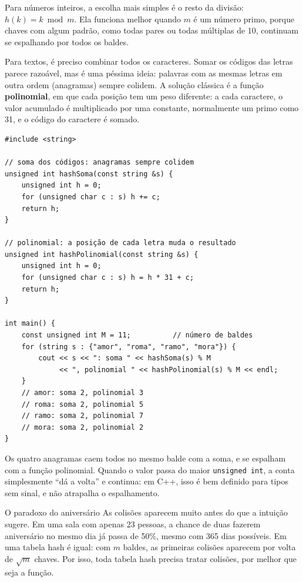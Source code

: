 Para números inteiros, a escolha mais simples é o resto da divisão: $h(k) = k \bmod m$. Ela funciona melhor quando $m$ é um número primo, porque chaves com algum padrão, como todas pares ou todas múltiplas de 10, continuam se espalhando por todos os baldes.

Para textos, é preciso combinar todos os caracteres. Somar os códigos das letras parece razoável, mas é uma péssima ideia: palavras com as mesmas letras em outra ordem (anagramas) sempre colidem. A solução clássica é a função \textbf{polinomial}, em que cada posição tem um peso diferente: a cada caractere, o valor acumulado é multiplicado por uma constante, normalmente um primo como 31, e o código do caractere é somado.

\begin{codigo}
\begin{Verbatim}[breaklines=true, breaksymbolleft={}, fontsize=\footnotesize]
#include <string>

// soma dos códigos: anagramas sempre colidem
unsigned int hashSoma(const string &s) {
    unsigned int h = 0;
    for (unsigned char c : s) h += c;
    return h;
}

// polinomial: a posição de cada letra muda o resultado
unsigned int hashPolinomial(const string &s) {
    unsigned int h = 0;
    for (unsigned char c : s) h = h * 31 + c;
    return h;
}

int main() {
    const unsigned int M = 11;          // número de baldes
    for (string s : {"amor", "roma", "ramo", "mora"}) {
        cout << s << ": soma " << hashSoma(s) % M
             << ", polinomial " << hashPolinomial(s) % M << endl;
    }
    // amor: soma 2, polinomial 3
    // roma: soma 2, polinomial 5
    // ramo: soma 2, polinomial 7
    // mora: soma 2, polinomial 2
}
\end{Verbatim}
\end{codigo}

Os quatro anagramas caem todos no mesmo balde com a soma, e se espalham com a função polinomial. Quando o valor passa do maior \texttt{unsigned int}, a conta simplesmente ``dá a volta'' e continua: em C++, isso é bem definido para tipos sem sinal, e não atrapalha o espalhamento.

\begin{destaque}{O paradoxo do aniversário}
As colisões aparecem muito antes do que a intuição sugere. Em uma sala com apenas 23 pessoas, a chance de duas fazerem aniversário no mesmo dia já passa de 50\%, mesmo com 365 dias possíveis. Em uma tabela hash é igual: com $m$ baldes, as primeiras colisões aparecem por volta de $\sqrt{m}$ chaves. Por isso, toda tabela hash precisa tratar colisões, por melhor que seja a função.
\end{destaque}

